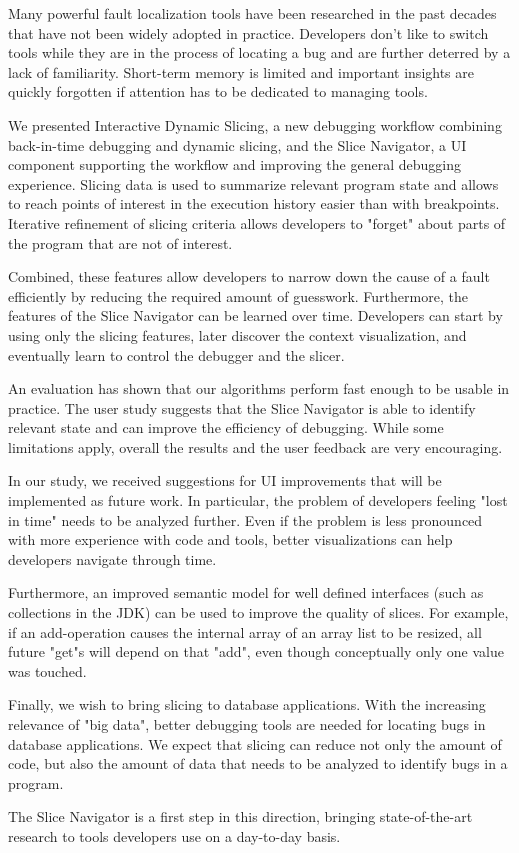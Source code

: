 \documentclass[
			english,
			review,
			]{elsarticle}
\begin{document}
Many powerful fault localization tools have been researched in the past decades that have not been widely adopted in practice.
Developers don't like to switch tools while they are in the process of locating a bug and are further deterred by a lack of familiarity.
Short-term memory is limited and important insights are quickly forgotten if attention has to be dedicated to managing tools.

We presented Interactive Dynamic Slicing, a new debugging workflow combining back-in-time debugging and dynamic slicing, and the Slice Navigator, a UI component supporting the workflow and improving the general debugging experience.
Slicing data is used to summarize relevant program state and allows to reach points of interest in the execution history easier than with breakpoints.
Iterative refinement of slicing criteria allows developers to "forget" about parts of the program that are not of interest.

Combined, these features allow developers to narrow down the cause of a fault efficiently by reducing the required amount of guesswork.
Furthermore, the features of the Slice Navigator can be learned over time.
Developers can start by using only the slicing features, later discover the context visualization, and eventually learn to control the debugger and the slicer.

An evaluation has shown that our algorithms perform fast enough to be usable in practice.
The user study suggests that the Slice Navigator is able to identify relevant state and can improve the efficiency of debugging.
While some limitations apply, overall the results and the user feedback are very encouraging.

In our study, we received suggestions for UI improvements that will be implemented as future work.
In particular, the problem of developers feeling "lost in time" needs to be analyzed further.
Even if the problem is less pronounced with more experience with code and tools, better visualizations can help developers navigate through time.

Furthermore, an improved semantic model for well defined interfaces (such as collections in the JDK) can be used to improve the quality of slices. 
For example, if an add-operation causes the internal array of an array list to be resized, all future "get"s will depend on that "add", even though conceptually only one value was touched.

Finally, we wish to bring slicing to database applications.
With the increasing relevance of "big data", better debugging tools are needed for locating bugs in database applications.
We expect that slicing can reduce not only the amount of code, but also the amount of data that needs to be analyzed to identify bugs in a program.

The Slice Navigator is a first step in this direction, bringing state-of-the-art research to tools developers use on a day-to-day basis.



\end{document}
